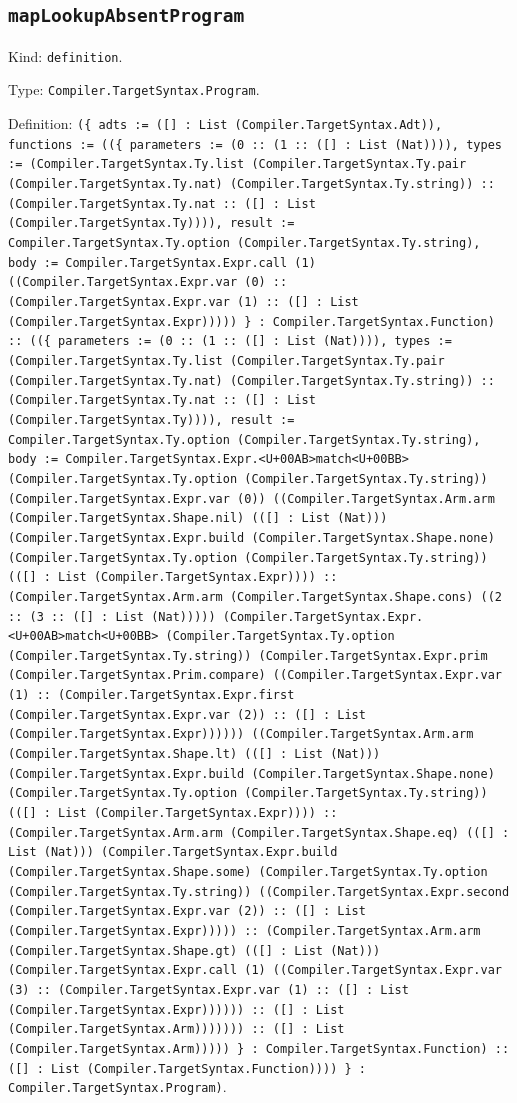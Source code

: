 \documentclass[11pt]{article}
\begin{document}
\subsection*{\texttt{mapLookupAbsentProgram}}
\noindent Kind: \texttt{definition}.\par
\noindent Type: \texttt{Compiler.TargetSyntax.Program}.\par
\noindent Definition: \texttt{(\{ adts := ([] : List (Compiler.TargetSyntax.Adt)), functions := ((\{ parameters := (0 :: (1 :: ([] : List (Nat)))), types := (Compiler.TargetSyntax.Ty.list (Compiler.TargetSyntax.Ty.pair (Compiler.TargetSyntax.Ty.nat) (Compiler.TargetSyntax.Ty.string)) :: (Compiler.TargetSyntax.Ty.nat :: ([] : List (Compiler.TargetSyntax.Ty)))), result := Compiler.TargetSyntax.Ty.option (Compiler.TargetSyntax.Ty.string), body := Compiler.TargetSyntax.Expr.call (1) ((Compiler.TargetSyntax.Expr.var (0) :: (Compiler.TargetSyntax.Expr.var (1) :: ([] : List (Compiler.TargetSyntax.Expr))))) \} : Compiler.TargetSyntax.Function) :: ((\{ parameters := (0 :: (1 :: ([] : List (Nat)))), types := (Compiler.TargetSyntax.Ty.list (Compiler.TargetSyntax.Ty.pair (Compiler.TargetSyntax.Ty.nat) (Compiler.TargetSyntax.Ty.string)) :: (Compiler.TargetSyntax.Ty.nat :: ([] : List (Compiler.TargetSyntax.Ty)))), result := Compiler.TargetSyntax.Ty.option (Compiler.TargetSyntax.Ty.string), body := Compiler.TargetSyntax.Expr.<U+00AB>match<U+00BB> (Compiler.TargetSyntax.Ty.option (Compiler.TargetSyntax.Ty.string)) (Compiler.TargetSyntax.Expr.var (0)) ((Compiler.TargetSyntax.Arm.arm (Compiler.TargetSyntax.Shape.nil) (([] : List (Nat))) (Compiler.TargetSyntax.Expr.build (Compiler.TargetSyntax.Shape.none) (Compiler.TargetSyntax.Ty.option (Compiler.TargetSyntax.Ty.string)) (([] : List (Compiler.TargetSyntax.Expr)))) :: (Compiler.TargetSyntax.Arm.arm (Compiler.TargetSyntax.Shape.cons) ((2 :: (3 :: ([] : List (Nat))))) (Compiler.TargetSyntax.Expr.<U+00AB>match<U+00BB> (Compiler.TargetSyntax.Ty.option (Compiler.TargetSyntax.Ty.string)) (Compiler.TargetSyntax.Expr.prim (Compiler.TargetSyntax.Prim.compare) ((Compiler.TargetSyntax.Expr.var (1) :: (Compiler.TargetSyntax.Expr.first (Compiler.TargetSyntax.Expr.var (2)) :: ([] : List (Compiler.TargetSyntax.Expr)))))) ((Compiler.TargetSyntax.Arm.arm (Compiler.TargetSyntax.Shape.lt) (([] : List (Nat))) (Compiler.TargetSyntax.Expr.build (Compiler.TargetSyntax.Shape.none) (Compiler.TargetSyntax.Ty.option (Compiler.TargetSyntax.Ty.string)) (([] : List (Compiler.TargetSyntax.Expr)))) :: (Compiler.TargetSyntax.Arm.arm (Compiler.TargetSyntax.Shape.eq) (([] : List (Nat))) (Compiler.TargetSyntax.Expr.build (Compiler.TargetSyntax.Shape.some) (Compiler.TargetSyntax.Ty.option (Compiler.TargetSyntax.Ty.string)) ((Compiler.TargetSyntax.Expr.second (Compiler.TargetSyntax.Expr.var (2)) :: ([] : List (Compiler.TargetSyntax.Expr))))) :: (Compiler.TargetSyntax.Arm.arm (Compiler.TargetSyntax.Shape.gt) (([] : List (Nat))) (Compiler.TargetSyntax.Expr.call (1) ((Compiler.TargetSyntax.Expr.var (3) :: (Compiler.TargetSyntax.Expr.var (1) :: ([] : List (Compiler.TargetSyntax.Expr)))))) :: ([] : List (Compiler.TargetSyntax.Arm))))))) :: ([] : List (Compiler.TargetSyntax.Arm))))) \} : Compiler.TargetSyntax.Function) :: ([] : List (Compiler.TargetSyntax.Function)))) \} : Compiler.TargetSyntax.Program)}.\par
\end{document}
